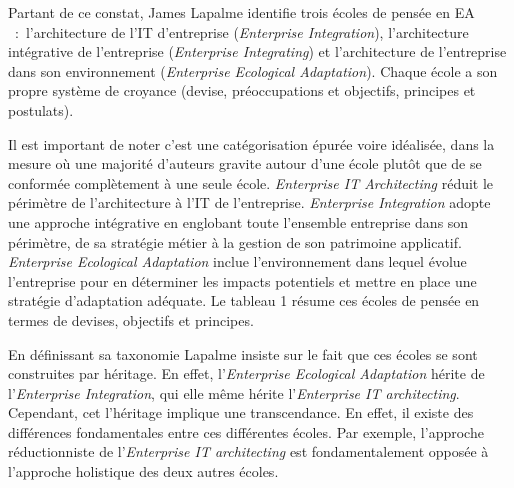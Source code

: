 Partant de ce constat, James Lapalme identifie trois écoles de pensée en EA \cite{lapalme2012three}~:~l'architecture de l'IT d'entreprise (\textit{Enterprise Integration}), l'architecture intégrative de l'entreprise (\textit{Enterprise Integrating}) et l'architecture de l'entreprise dans son environnement (\textit{Enterprise Ecological Adaptation}). Chaque école a son propre système de croyance (devise, préoccupations et objectifs, principes et postulats).



Il est important de noter c'est une catégorisation épurée voire idéalisée, 
dans la mesure où une majorité d'auteurs gravite autour d'une école plutôt que 
de se conformée complètement à une seule école. \textit{Enterprise IT Architecting} réduit le périmètre de l'architecture à l'IT de l'entreprise. \textit{Enterprise Integration} adopte une approche intégrative en englobant toute l'ensemble entreprise dans son périmètre, de sa stratégie métier à la gestion de son patrimoine applicatif. \textit{Enterprise Ecological Adaptation} inclue l'environnement dans lequel évolue l'entreprise pour en déterminer les impacts potentiels et mettre en place une stratégie d'adaptation adéquate.  Le tableau 1 résume ces écoles de pensée en termes de devises, objectifs et principes. 

En définissant sa taxonomie  Lapalme insiste sur le fait que ces écoles se sont construites par héritage. En effet, l'\textit{Enterprise Ecological Adaptation} hérite de l'\textit{Enterprise Integration}, qui elle même hérite l'\textit{Enterprise IT architecting}. Cependant, cet l'héritage implique une transcendance. En effet, il existe des différences fondamentales entre ces différentes écoles. Par exemple, l'approche réductionniste de l'\textit{Enterprise IT architecting} est fondamentalement opposée à l'approche holistique des deux autres écoles.


